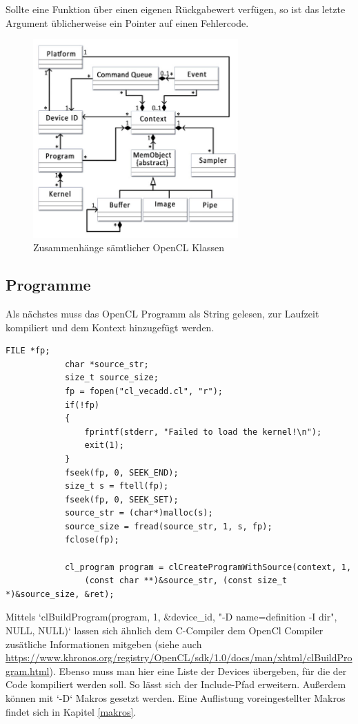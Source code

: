 			Sollte eine Funktion über einen eigenen Rückgabewert verfügen, so ist das letzte Argument üblicherweise ein Pointer auf einen Fehlercode.
			\begin{figure}[h]
				\centering
				\includegraphics[width=0.7\textwidth]{chapter4/pictures/class.jpg}
				\caption{Zusammenhänge sämtlicher OpenCL Klassen}
				\label{4:class}
			\end{figure}				
				
			\subsection{Programme}
			Als nächstes muss das OpenCL Programm als String gelesen, zur Laufzeit kompiliert und dem Kontext hinzugefügt werden. 
			\begin{lstlisting}[caption=OpenCL Programm]
			FILE *fp;
			char *source_str;
			size_t source_size;
			fp = fopen("cl_vecadd.cl", "r");
			if(!fp)
			{
				fprintf(stderr, "Failed to load the kernel!\n");
				exit(1);
			}
			fseek(fp, 0, SEEK_END);
			size_t s = ftell(fp);
			fseek(fp, 0, SEEK_SET); 
			source_str = (char*)malloc(s);
			source_size = fread(source_str, 1, s, fp);
			fclose(fp);
			
			cl_program program = clCreateProgramWithSource(context, 1, 
				(const char **)&source_str, (const size_t *)&source_size, &ret);
			\end{lstlisting}
			
			Mittels \li`clBuildProgram(program, 1, &device_id, "-D name=definition -I dir", NULL, NULL)` lassen sich ähnlich dem C-Compiler dem OpenCl Compiler zusätliche Informationen mitgeben (siehe auch \url{https://www.khronos.org/registry/OpenCL/sdk/1.0/docs/man/xhtml/clBuildProgram.html}). Ebenso muss man hier eine Liste der Devices übergeben, für die der Code kompiliert werden soll. So lässt sich der Include-Pfad erweitern. Außerdem können mit \li`-D` Makros gesetzt werden. Eine Auflistung voreingestellter Makros findet sich in Kapitel \ref{makros}.
			
